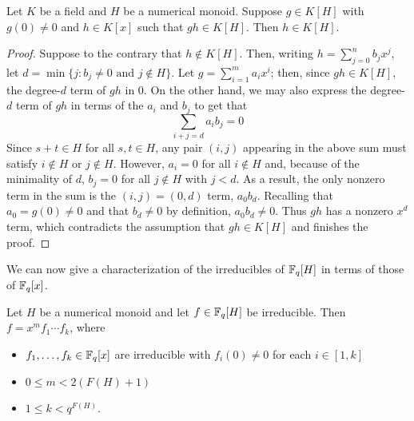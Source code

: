 \begin{lemma}\label{lem:numerical int closure}
	Let $K$ be a field and $H$ be a numerical monoid.
	Suppose $g\in K[H]$ with $g(0) \neq 0$ and $h\in K[x]$ such that $gh\in K[H]$.
	Then $h\in K[H]$.
\end{lemma}

\begin{proof}
	Suppose to the contrary that $h\notin K[H]$.
	Then, writing $h = \sum_{j=0}^n b_j x^j$, let $d = \min\{j: b_j\neq0 \textrm{ and } j\notin H\}$.
	Let $g = \sum_{i=1}^m a_ix^i$; then, since $gh\in K[H]$, the degree-$d$ term of $gh$ in $0$.
	On the other hand, we may also express the degree-$d$ term of $gh$ in terms of the $a_i$ and $b_j$ to get that
	\[ \sum_{i+j = d} a_i b_j = 0 \]
	Since $s+t\in H$ for all $s,t\in H$, any pair $(i,j)$ appearing in the above sum must satisfy $i\notin H$ or $j\notin H$.
	However, $a_i = 0$ for all $i\notin H$ and, because of the minimality of $d$, $b_j = 0$ for all $j\notin H$ with $j < d$.
	As a result, the only nonzero term in the sum is the $(i,j) = (0,d)$ term, $a_0b_d$.
	Recalling that $a_0 = g(0) \neq 0$ and that $b_d \neq 0$ by definition, $a_0 b_d \neq 0$.
	Thus $gh$ has a nonzero $x^d$ term, which contradicts the assumption that $gh\in K[H]$ and finishes the proof.
\end{proof}

We can now give a characterization of the irreducibles of $\mathbb{F}_q[H]$ in terms of those of $\mathbb{F}_q[x]$.

\begin{prop}\label{prop:num ring atom classification}
	Let $H$ be a numerical monoid and let $f\in \mathbb{F}_q[H]$ be irreducible.
	Then $f = x^m f_1\cdots f_k$, where
	\begin{itemize}
		\item $f_1,\dots, f_k\in \mathbb{F}_q[x]$ are irreducible with $f_i(0)\neq 0$ for each $i\in [1,k]$
		\item $0\le m < 2(F(H)+1)$
		\item $1\le k<q^{F(H)}$.
	\end{itemize}
\end{prop}

